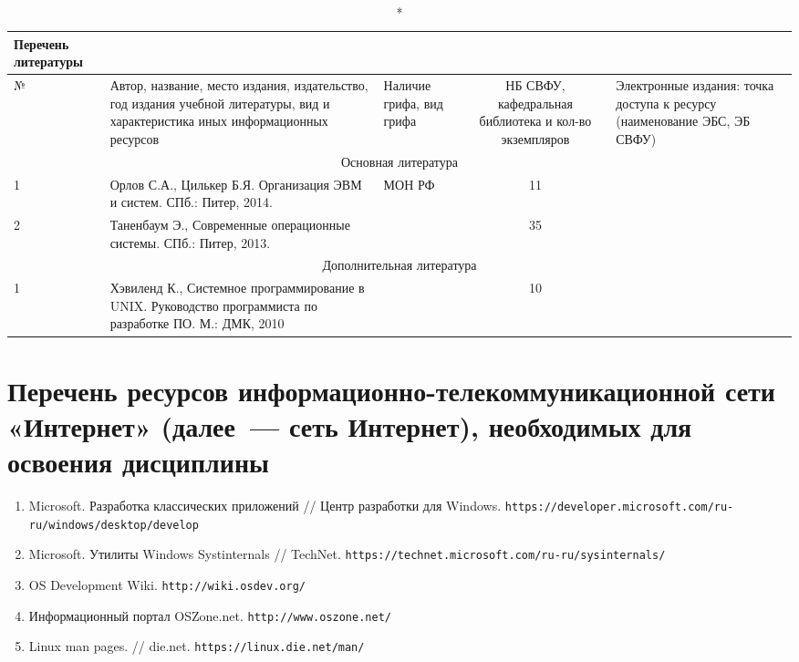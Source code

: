 \documentclass[a4paper,12pt]{article}
\begin{document}
  \begin{longtable}{|l|p{7cm}|p{18mm}|c|p{32mm}|}
  \caption*{Перечень литературы}\\
  \hline
  № & 
  \centering\small\arraybackslash Автор, название, место издания, издательство, год издания учебной литературы, вид и характеристика иных информационных ресурсов &
  \multicolumn{1}{p{18mm}|}{\centering\small\arraybackslash Наличие грифа, вид грифа} &
  \multicolumn{1}{p{21mm}|}{\centering\small\arraybackslash НБ СВФУ, кафедральная библиотека и кол-во экземпляров} & 
  \centering\small\arraybackslash Электронные издания: точка доступа к ресурсу (наименование ЭБС, ЭБ СВФУ)\\
  \hline
  \multicolumn{5}{|c|}{Основная литература}\\
  \hline
  1 &\raggedright\arraybackslash Орлов С.А., Цилькер Б.Я. Организация ЭВМ и систем. СПб.: Питер, 2014.  &  МОН РФ  &  11  &  
  \\
  \hline
  2 &\raggedright\arraybackslash Таненбаум Э., Современные операционные системы. СПб.: Питер, 2013.     &          &  35  &  
  \\
  \hline
  
  \multicolumn{5}{|c|}{Дополнительная литература}\\
  \hline
  1 &\raggedright\arraybackslash Хэвиленд К., Системное программирование в UNIX. Руководство программиста по разработке ПО. М.: ДМК, 2010  &   &  10  &  
  \\
  \hline
  
  \end{longtable}
  
\section{Перечень ресурсов информационно-телекоммуникационной сети «Интернет» (далее~--- сеть Интернет), необходимых для освоения дисциплины}
\begin{enumerate}
  \raggedright
  
  \item Microsoft. Разработка классических приложений // Центр разработки для Windows. \texttt{https://developer.microsoft.com/ru-ru/windows/desktop/develop} 
  
  \item Microsoft. Утилиты Windows Systinternals // TechNet. \texttt{https://technet.microsoft.com/ru-ru/sysinternals/} 
  
  \item OS Development Wiki. \texttt{http://wiki.osdev.org/} 
  
  \item Информационный портал OSZone.net. \texttt{http://www.oszone.net/} 
  
  \item Linux man pages. // die.net. \texttt{https://linux.die.net/man/} 
  
\end{enumerate}
\end{document}
